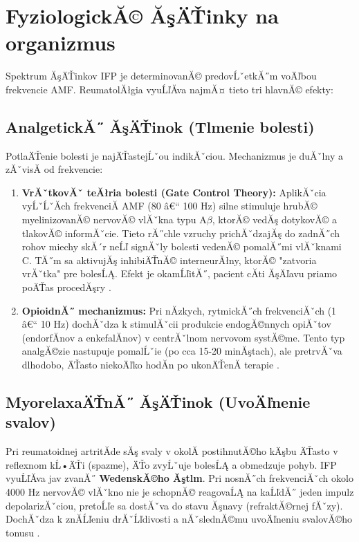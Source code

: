 \section{FyziologickĂ© ĂşÄŤinky na organizmus}

Spektrum ĂşÄŤinkov IFP je determinovanĂ© predovĹˇetkĂ˝m voÄľbou frekvencie AMF. ReumatolĂłgia vyuĹľĂ­va najmĂ¤ tieto tri hlavnĂ© efekty:

\subsection{AnalgetickĂ˝ ĂşÄŤinok (Tlmenie bolesti)}

PotlaÄŤenie bolesti je najÄŤastejĹˇou indikĂˇciou. Mechanizmus je duĂˇlny a zĂˇvisĂ­ od frekvencie:

\begin{enumerate}
    \item \textbf{VrĂˇtkovĂˇ teĂłria bolesti (Gate Control Theory):} AplikĂˇcia vyĹˇĹˇĂ­ch frekvenciĂ­ AMF (80 â€“ 100 Hz) silne stimuluje hrubĂ© myelinizovanĂ© nervovĂ© vlĂˇkna typu A$\beta$, ktorĂ© vedĂş dotykovĂ© a tlakovĂ© informĂˇcie. Tieto rĂ˝chle vzruchy prichĂˇdzajĂş do zadnĂ˝ch rohov miechy skĂ´r neĹľ signĂˇly bolesti vedenĂ© pomalĂ˝mi vlĂˇknami C. TĂ˝m sa aktivujĂş inhibiÄŤnĂ© interneurĂłny, ktorĂ© "zatvoria vrĂˇtka" pre bolesĹĄ. Efekt je okamĹľitĂ˝, pacient cĂ­ti ĂşÄľavu priamo poÄŤas procedĂşry \parencite{Kolar2012}.
    \item \textbf{OpioidnĂ˝ mechanizmus:} Pri nĂ­zkych, rytmickĂ˝ch frekvenciĂˇch (1 â€“ 10 Hz) dochĂˇdza k stimulĂˇcii produkcie endogĂ©nnych opiĂˇtov (endorfĂ­nov a enkefalĂ­nov) v centrĂˇlnom nervovom systĂ©me. Tento typ analgĂ©zie nastupuje pomalĹˇie (po cca 15-20 minĂştach), ale pretrvĂˇva dlhodobo, ÄŤasto niekoÄľko hodĂ­n po ukonÄŤenĂ­ terapie \parencite{Navratil2019}.
\end{enumerate}

\subsection{MyorelaxaÄŤnĂ˝ ĂşÄŤinok (UvoÄľnenie svalov)}

Pri reumatoidnej artritĂ­de sĂş svaly v okolĂ­ postihnutĂ©ho kÄşbu ÄŤasto v reflexnom kĹ•ÄŤi (spazme), ÄŤo zvyĹˇuje bolesĹĄ a obmedzuje pohyb. IFP vyuĹľĂ­va jav zvanĂ˝ \textbf{WedenskĂ©ho Ăştlm}. Pri nosnĂ˝ch frekvenciĂˇch okolo 4000 Hz nervovĂ© vlĂˇkno nie je schopnĂ© reagovaĹĄ na kaĹľdĂ˝ jeden impulz depolarizĂˇciou, pretoĹľe sa dostĂˇva do stavu Ăşnavy (refraktĂ©rnej fĂˇzy). DochĂˇdza k znĂ­Ĺľeniu drĂˇĹľdivosti a nĂˇslednĂ©mu uvoÄľneniu svalovĂ©ho tonusu \parencite{Podebradsky2009}.

